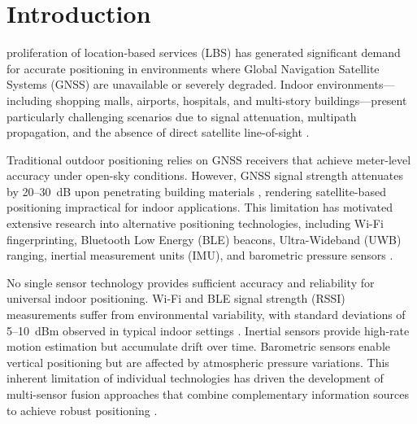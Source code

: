\documentclass[journal,twocolumn]{IEEEtran}
\begin{document}
\section{Introduction}

 proliferation of location-based services (LBS) has generated significant demand for accurate positioning in environments where Global Navigation Satellite Systems (GNSS) are unavailable or severely degraded. Indoor environments---including shopping malls, airports, hospitals, and multi-story buildings---present particularly challenging scenarios due to signal attenuation, multipath propagation, and the absence of direct satellite line-of-sight \cite{zafari2019survey}.

Traditional outdoor positioning relies on GNSS receivers that achieve meter-level accuracy under open-sky conditions. However, GNSS signal strength attenuates by 20--30~dB upon penetrating building materials \cite{groves2013principles}, rendering satellite-based positioning impractical for indoor applications. This limitation has motivated extensive research into alternative positioning technologies, including Wi-Fi fingerprinting, Bluetooth Low Energy (BLE) beacons, Ultra-Wideband (UWB) ranging, inertial measurement units (IMU), and barometric pressure sensors \cite{davidson2017survey}.

No single sensor technology provides sufficient accuracy and reliability for universal indoor positioning. Wi-Fi and BLE signal strength (RSSI) measurements suffer from environmental variability, with standard deviations of 5--10~dBm observed in typical indoor settings \cite{he2016wifi}. Inertial sensors provide high-rate motion estimation but accumulate drift over time. Barometric sensors enable vertical positioning but are affected by atmospheric pressure variations. This inherent limitation of individual technologies has driven the development of multi-sensor fusion approaches that combine complementary information sources to achieve robust positioning \cite{harle2013survey}.
\end{document}
